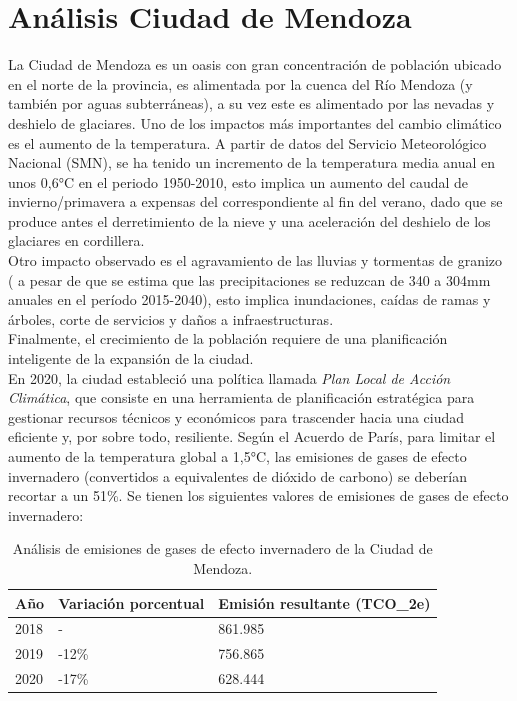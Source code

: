 \documentclass[runningheads]{llncs}
\begin{document}
\section{Análisis Ciudad de Mendoza}
La Ciudad de Mendoza es un oasis con gran concentración de población ubicado en el norte de la provincia, es alimentada por la cuenca del Río Mendoza (y también por aguas subterráneas), a su vez este es alimentado por las nevadas y deshielo de glaciares. Uno de los impactos más importantes del cambio climático es el aumento de la temperatura.  A partir de datos del Servicio Meteorológico Nacional (SMN), se ha tenido un incremento de la temperatura media anual en unos 0,6°C en el periodo 1950-2010, esto implica un aumento del caudal de invierno/primavera a expensas del correspondiente al fin del verano, dado que se produce antes el derretimiento de la nieve y una aceleración del deshielo de los glaciares en cordillera.~\cite{ref_url11}\\

Otro impacto observado es el agravamiento de las lluvias y tormentas de granizo ( a pesar de que se estima que las precipitaciones se reduzcan de 340 a 304mm anuales en el período 2015-2040), esto implica inundaciones, caídas de ramas y árboles, corte de servicios y daños a infraestructuras. \\

Finalmente, el crecimiento de la población requiere de una planificación inteligente de la expansión de la ciudad.\\

En 2020, la ciudad estableció una política llamada \textit{Plan Local de Acción Climática}, que consiste en una herramienta de planificación estratégica para gestionar recursos técnicos y económicos para trascender hacia una ciudad eficiente y, por sobre todo, resiliente. Según el Acuerdo de París, para limitar el aumento de la temperatura global a 1,5°C, las emisiones de gases de efecto invernadero (convertidos a equivalentes de dióxido de carbono) se deberían recortar a un 51\%. Se tienen los siguientes valores de emisiones de gases de efecto invernadero:~\cite{ref_url13}

\begin{table}
\centering
\caption{Análisis de emisiones de gases de efecto invernadero de la Ciudad de Mendoza.}\label{tab1}
\begin{tabular}{|l|l|l|}

\hline
Año  &  Variación porcentual & Emisión resultante (TCO_2e)\\
\hline
2018 & -  & 861.985\\
2019 &  -12\% & 756.865\\
2020 & -17\% & 628.444\\

\hline
\end{tabular}
\end{table}
\end{document}
